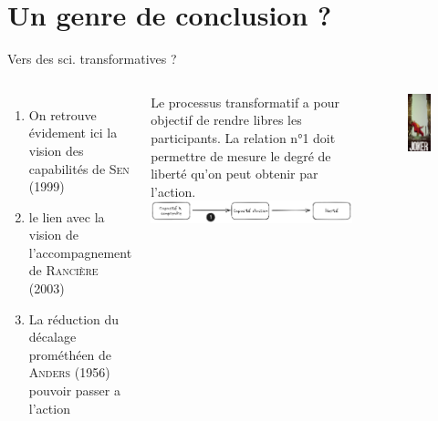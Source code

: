 \documentclass[newPxFont]{beamer}
\begin{document}

\section{Un genre de conclusion ?}

\begin{frame}[c]{Vers des sci. transformatives ?}
  \vspace{-1cm}
  \begin{columns}[onlytextwidth,T]
    \column{\dimexpr\linewidth-30mm-5mm}
    \begin{enumerate}
        \item On retrouve évidement ici la vision des capabilités de \textsc{Sen} (1999)
        \item le lien avec la vision de l’accompagnement de \textsc{Rancière} (2003)
        \item La réduction du décalage prométhéen de \textsc{Anders} (1956) pouvoir passer a l'action
    \end{enumerate}
    Le processus transformatif a pour objectif de rendre libres les participants. La relation n°1 doit permettre de mesure le degré de liberté qu’on peut obtenir par l’action.
    \includegraphics[width=7.5cm]{img/Drawing_jpm}
    \column{30mm}
    \begin{figure}
      \includegraphics[width=3.9cm]{img/joker.jpg}
    \end{figure}
  \end{columns}
\end{frame}
\end{document}
